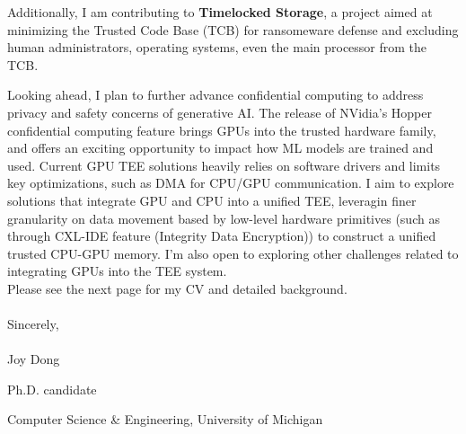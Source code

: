 Additionally, I am contributing to \textbf{Timelocked Storage}, a project aimed at minimizing the Trusted Code Base (TCB) for ransomeware defense and excluding human administrators, operating systems, even the main processor from the TCB. \par

Looking ahead, I plan to further advance confidential computing to address privacy and safety concerns of generative AI.  The release of NVidia's Hopper confidential computing feature brings GPUs into the trusted hardware family, and offers an exciting opportunity to impact how ML models are trained and used. Current GPU TEE solutions heavily relies on software drivers and limits key optimizations, such as DMA for CPU/GPU communication. I aim to explore solutions that integrate GPU and CPU into a unified TEE, leveragin finer granularity on data movement based by low-level hardware primitives (such as through CXL-IDE feature (Integrity Data Encryption)) to construct a unified trusted CPU-GPU memory. I'm also open to exploring other challenges related to integrating GPUs into the TEE system. \\


Please see the next page for my CV and detailed background. \\
\vspace{3ex}
\paragraph*{}
\:\: Sincerely, 
\paragraph*{}
\:\: Joy Dong \par
Ph.D. candidate\par
Computer Science \& Engineering, University of Michigan
